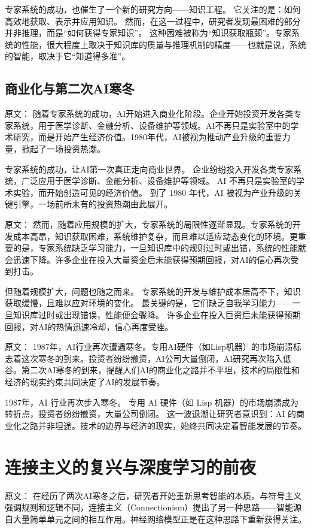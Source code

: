 专家系统的成功，也催生了一个新的研究方向——知识工程。  
它关注的是：如何高效地获取、表示并应用知识。  
然而，在这一过程中，研究者发现最困难的部分并非推理，而是“如何获得专家知识”。  
这种困难被称为“知识获取瓶颈”。专家系统的性能，很大程度上取决于知识库的质量与推理机制的精度——也就是说，系统的智能，取决于它“知道得多准”。

\subsection{商业化与第二次AI寒冬}

原文：
随着专家系统的成功，AI开始进入商业化阶段。企业开始投资开发各类专家系统，用于医学诊断、金融分析、设备维护等领域。AI不再只是实验室中的学术研究，而是开始产生经济价值。1980年代，AI被视为推动产业升级的重要力量，掀起了一场投资热潮。

专家系统的成功，让AI第一次真正走向商业世界。  
企业纷纷投入开发各类专家系统，广泛应用于医学诊断、金融分析、设备维护等领域。  
AI 不再只是实验室的学术实验，而开始创造可见的经济价值。  
到了 1980 年代，AI 被视为产业升级的关键引擎，一场前所未有的投资热潮由此展开。

原文：
然而，随着应用规模的扩大，专家系统的局限性逐渐显现。专家系统的开发成本高昂，知识获取困难，系统维护复杂，而且难以适应动态变化的环境。更重要的是，专家系统缺乏学习能力，一旦知识库中的规则过时或出错，系统的性能就会迅速下降。许多企业在投入大量资金后未能获得预期回报，对AI的信心再次受到打击。

但随着规模扩大，问题也随之而来。  
专家系统的开发与维护成本居高不下，知识获取缓慢，且难以应对环境的变化。  
最关键的是，它们缺乏自我学习能力——一旦知识库过时或出现错误，性能便会骤降。  
许多企业在投入巨资后未能获得预期回报，对AI的热情迅速冷却，信心再度受挫。

原文：
1987年，AI行业再次遭遇寒冬。专用AI硬件（如Lisp机器）的市场崩溃标志着这次寒冬的到来。投资者纷纷撤资，AI公司大量倒闭，AI研究再次陷入低谷。第二次AI寒冬的到来，提醒人们AI的商业化之路并不平坦，技术的局限性和经济的现实约束共同决定了AI的发展节奏。

1987年，AI 行业再次步入寒冬。  
专用 AI 硬件（如 Lisp 机器）的市场崩溃成为转折点，投资者纷纷撤资，大量公司倒闭。  
这一波退潮让研究者意识到：AI 的商业化之路并非坦途。技术的边界与经济的现实，始终共同决定着智能发展的节奏。

\section{连接主义的复兴与深度学习的前夜}

原文：
在经历了两次AI寒冬之后，研究者开始重新思考智能的本质。与符号主义强调规则和逻辑不同，连接主义（Connectionism）提出了另一种思路——智能源自大量简单单元之间的相互作用。神经网络模型正是在这种思路下重新获得关注。

